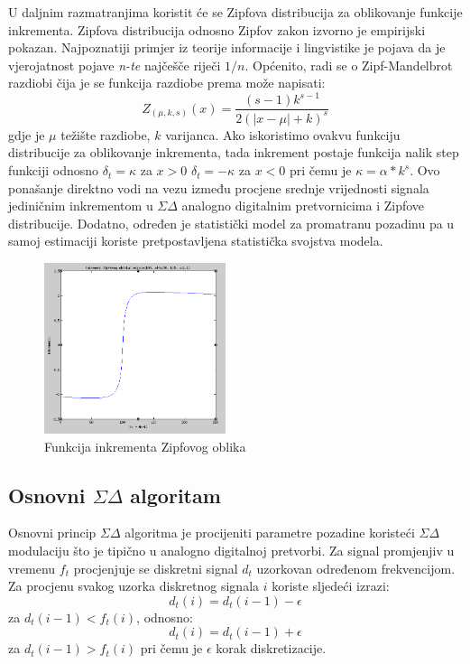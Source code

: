 \documentclass[a4paper,twocolumn]{article}
\providecommand{\abs}[1]{\lvert#1\rvert}
\begin{document}
U daljnim razmatranjima koristit će se Zipfova distribucija za oblikovanje
funkcije inkrementa. Zipfova distribucija odnosno Zipfov zakon izvorno je
empirijski pokazan. Najpoznatiji primjer iz teorije informacije i lingvistike
je pojava da je vjerojatnost pojave \textit{n-te} najčešče riječi \(1/n\).
Općenito, radi se o Zipf-Mandelbrot razdiobi čija je se funkcija razdiobe
prema \cite{zipf} može napisati:
\begin{equation}
Z_{(\mu, k, s)}(x) = \frac{(s-1)k^{s-1}}{2(\abs{x - \mu} + k)^s}
\end{equation}
gdje je \(\mu\) težište razdiobe, \(k\) varijanca. Ako iskoristimo ovakvu
funkciju distribucije za oblikovanje inkrementa, tada inkrement postaje
funkcija nalik step funkciji odnosno \(\delta_t = \kappa\) za \(x > 0\)
\(\delta_t = -\kappa\) za \(x < 0\) pri čemu je \(\kappa = \alpha * k^s\).
Ovo ponašanje direktno vodi na vezu između procjene srednje vrijednosti signala
jediničnim inkrementom u \(\Sigma\Delta\) analogno digitalnim pretvornicima i
Zipfove distribucije. Dodatno, određen je statistički model za promatranu
pozadinu pa u samoj estimaciji koriste pretpostavljena statistička
svojstva modela.

\begin{figure}[htb]
\begin{center}
\includegraphics[height=5cm]{zipf.png}
\caption{Funkcija inkrementa Zipfovog oblika}
\end{center}
\end{figure}

\subsection{Osnovni \(\Sigma\Delta\) algoritam}

Osnovni princip \(\Sigma\Delta\) algoritma je procijeniti parametre pozadine koristeći
\(\Sigma\Delta\) modulaciju što je tipično u analogno digitalnoj pretvorbi. Za signal
promjenjiv u vremenu \(f_t\) procjenjuje se diskretni signal \(d_t\) uzorkovan
određenom frekvencijom. Za procjenu svakog uzorka diskretnog signala \(i\)
koriste sljedeći izrazi:
\begin{equation}
d_t(i) = d_t(i-1) - \epsilon
\end{equation}
za \(d_t(i-1) < f_t(i)\), odnosno:
\begin{equation}
d_t(i) = d_t(i-1) + \epsilon
\end{equation}
za \(d_t(i-1) > f_t(i)\) pri čemu je \(\epsilon\) korak diskretizacije.
\end{document}
